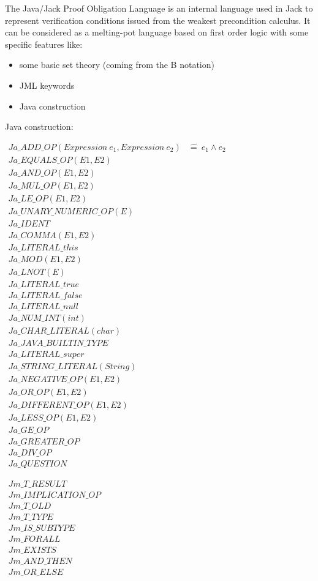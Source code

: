 \label{JPOL}
The Java/Jack Proof Obligation Language is an internal language used in Jack to represent verification conditions issued from the weakest precondition calculus. It can be considered as a melting-pot language based on first order logic with some specific features like:
\begin{itemize}
\item some basic set theory (coming from the B notation)
\item JML keywords
\item Java construction
\end{itemize}
Java construction:

$\begin{array}{ll}
Ja\_ADD\_OP(Expression \ e_1, Expression \ e_2) & \hat{=} \ e_1 \land e_2 \\
	Ja\_EQUALS\_OP(E1,E2) & \\
	Ja\_AND\_OP(E1,E2)& \\
	Ja\_MUL\_OP(E1,E2)& \\
	Ja\_LE\_OP(E1,E2)& \\
	Ja\_UNARY\_NUMERIC\_OP(E)& \\
	Ja\_IDENT& \\
	Ja\_COMMA(E1,E2)& \\
	Ja\_LITERAL\_this& \\
	Ja\_MOD(E1,E2)& \\
	Ja\_LNOT(E)& \\
	Ja\_LITERAL\_true& \\
	Ja\_LITERAL\_false& \\
	Ja\_LITERAL\_null& \\
	Ja\_NUM\_INT(int)& \\
	Ja\_CHAR\_LITERAL(char)& \\
	Ja\_JAVA\_BUILTIN\_TYPE& \\
	Ja\_LITERAL\_super& \\
	Ja\_STRING\_LITERAL(String)& \\
	Ja\_NEGATIVE\_OP(E1,E2)& \\
	Ja\_OR\_OP(E1,E2)& \\
	Ja\_DIFFERENT\_OP(E1,E2)& \\
	Ja\_LESS\_OP(E1,E2)& \\
	Ja\_GE\_OP& \\
	Ja\_GREATER\_OP& \\
	Ja\_DIV\_OP& \\
	Ja\_QUESTION& 
\end{array}$

$\begin{array}{ll}
	Jm\_T\_RESULT& \\
	Jm\_IMPLICATION\_OP& \\
	Jm\_T\_OLD& \\
	Jm\_T\_TYPE& \\
	Jm\_IS\_SUBTYPE& \\
	Jm\_FORALL& \\
	Jm\_EXISTS& \\
	Jm\_AND\_THEN& \\
	Jm\_OR\_ELSE& 
\end{array}$

